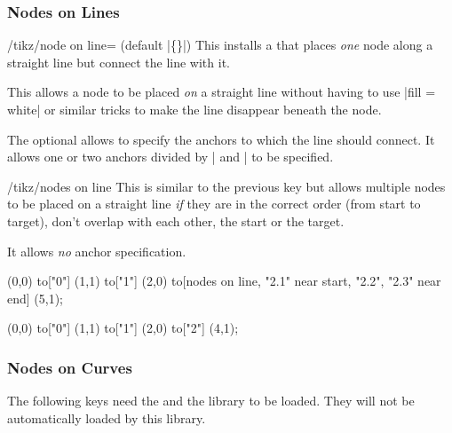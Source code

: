 \begin{multicols}{2}
\subsubsection{Nodes on Lines}

\begin{stylekey}{/tikz/node on line= (default |\{\}|)}
This installs a  that places \emph{one}
node along a straight line but connect the line with it.

This allows a node to be placed \emph{on} a straight line without having to
use |fill = white| or similar tricks to make the line disappear 
beneath the node.

The optional  allows to specify the
anchors to which the line should connect.
It allows one or two anchors divided by | and | to be specified.
\end{stylekey}

\begin{stylekey}{/tikz/nodes on line}
This is similar to the previous key but allows
multiple nodes to be placed on a straight line
\emph{if} they are in the correct order (from start to target),
don't overlap with each other, the start or the target.

It allows \emph{no} anchor specification.
\end{stylekey}

\begin{codeexample}[preamble=\usetikzlibrary{ext.nodes, quotes}]
\tikz[inner sep=.15em, circle, nodes=draw, sloped]
   (0,0) to["0"] (1,1)
                                             to["1"] (2,0)
    to[nodes on line, "2.1" near start, "2.2", "2.3" near end] (5,1);
\end{codeexample}
\begin{codeexample}[preamble=\usetikzlibrary{ext.nodes, quotes}]
\tikz[inner sep=.15em, nodes=draw]
  \draw[thick, ->, node on line=west and east]
     (0,0) to["0"] (1,1)
           to["1"] (2,0)
           to["2"] (4,1);
\end{codeexample}

\subsubsection{Nodes on Curves}
The following keys need the 
and the  \cite{spath3}
library to be loaded. They will not be automatically
loaded by this library.


\end{multicols}

